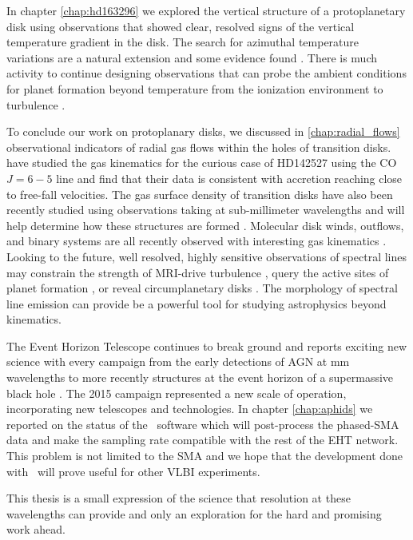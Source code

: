 In chapter \ref{chap:hd163296} we explored the vertical structure of a protoplanetary disk using 
observations that showed clear, resolved signs of the vertical temperature gradient in the disk.
The search for azimuthal temperature variations are a natural extension \citep{isella13} and 
some evidence found \citep{vanderplas14}.  There is much activity to continue designing
observations that can probe the ambient conditions 
for planet formation beyond temperature from the ionization environment \citep{cleeves14,teague15} to 
turbulence \citep{hughes11,guilloteau12,flock15,simon15}.

To conclude our work on protoplanary disks, we discussed in \ref{chap:radial_flows} observational indicators of 
radial gas flows within the holes of transition disks.  \citet{casassus15} have studied the gas kinematics for
the curious case of HD142527 using the CO $J = 6-5$ line and find that their data is consistent with
accretion reaching close to free-fall velocities.  The gas surface density of transition disks have also 
been recently studied using observations taking at sub-millimeter wavelengths 
\citep{bruderer14,zhang14,canovas15,perez15,vandermarel15} and will help determine how these structures are formed
\citep{bruderer13}.  Molecular disk winds, outflows, and binary systems are all recently observed 
with interesting gas kinematics \citep{klaasen13,dutrey14,williams14,salyk14,czekala15}.  Looking to the 
future, well resolved, highly sensitive observations of spectral lines may constrain the strength of MRI-drive
turbulence \citep{simon15}, query the active sites of planet formation \citep{kleeves15,ober15}, or reveal
circumplanetary disks \citep{perez15}.  The morphology of spectral line emission can provide be a powerful 
tool for studying astrophysics beyond kinematics.

The Event Horizon Telescope continues to break ground and reports exciting new science with every
campaign from the early detections of AGN at mm wavelengths \citep{doeleman05} to more recently structures
at the event horizon of a supermassive black hole \citep{doeleman08,doeleman09,doeleman13}.
The 2015 campaign represented a new scale of operation, incorporating new telescopes and
technologies.  In chapter \ref{chap:aphids} we reported on the status of the \APHIDS\, software which
will post-process the phased-SMA data and make the sampling rate compatible with the rest of the EHT
network.  This problem is not limited to the SMA and we hope that the development done with \APHIDS\, will
prove useful for other VLBI experiments. 

This thesis is a small expression of 
the science that resolution at these wavelengths can provide and only an exploration for the 
hard and promising work ahead.  
